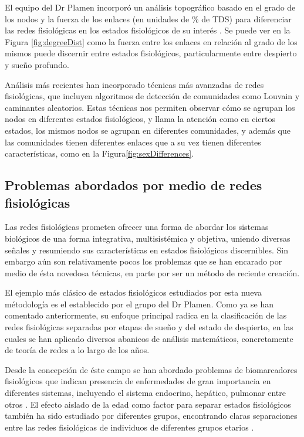 \documentclass[twoside,twocolumn]{article}
\begin{document}
El equipo del Dr Plamen incorporó un análisis topográfico basado en el grado de los nodos y la fuerza de los enlaces (en unidades de \% de TDS) para diferenciar las redes fisiológicas en los estados fisiológicos de su interés \cite{bashan2012network}\cite{2015Plasticity}.
Se puede ver en la Figura \ref{fig:degreeDist} como la fuerza entre los enlaces en relación al grado de los mismos puede discernir entre estados fisiológicos, particularmente entre despierto y sueño profundo.

Análisis más recientes han incorporado técnicas más avanzadas de redes fisiológicas, que incluyen algoritmos de detección de comunidades como Louvain y caminantes aleatorios\cite{barajas2021sex}\cite{barajas2021physiological}\cite{easton2020metabolic}\cite{chmiel2014spreading}.
Estas técnicas nos permiten observar cómo se agrupan los nodos en diferentes estados fisiológicos, y llama la atención como en ciertos estados, los mismos nodos se agrupan en diferentes comunidades, y además que las comunidades tienen diferentes enlaces que a su vez tienen diferentes características, como en la Figura\ref{fig:sexDifferences}.

\subsection{Problemas abordados por medio de redes fisiológicas}
Las redes fisiológicas prometen ofrecer una forma de abordar los sistemas biológicos de una forma integrativa, multisistémica y objetiva, uniendo diversas señales y resumiendo sus características en estados fisiológicos discernibles\cite{ivanov2016focus}.
Sin embargo aún son relativamente pocos los problemas que se han encarado por medio de ésta novedosa técnicas, en parte por ser un método de reciente creación.

El ejemplo más clásico de estados fisiológicos estudiados por esta nueva métodología es el establecido por el grupo del Dr Plamen.
Como ya se han comentado anteriormente, su enfoque principal radica en la clasificación de las redes fisiológicas separadas por etapas de sueño y del estado de despierto, en las cuales se han aplicado diversos abanicos de análisis matemáticos, concretamente de teoría de redes a lo largo de los años\cite{bashan2012network}\cite{lin2020dynamic}.

Desde la concepción de éste campo se han abordado problemas de biomarcadores fisiológicos que indican presencia de enfermedades de gran importancia en diferentes sistemas, incluyendo el sistema endocrino, hepático, pulmonar entre otros \cite{barajas2021physiological}.
El efecto aislado de la edad como factor para separar estados fisiológicos también ha sido estudiado por diferentes grupos, encontrando claras separaciones entre las redes fisiológicas de individuos de diferentes grupos etarios \cite{easton2020metabolic}\cite{chmiel2014spreading}.
\end{document}
